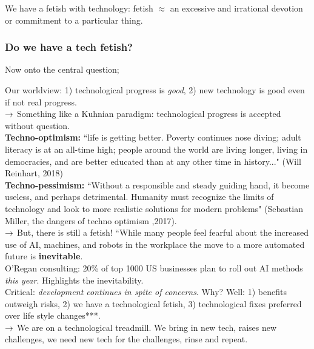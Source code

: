 We have a fetish with technology: fetish $\approx$ an excessive and irrational devotion or commitment to a particular thing.

\subsubsection{Do we have a tech fetish?}

Now onto the central question;


Our worldview: 1) technological progress is {\it good}, 2) new technology is good even if not real progress. \\

$\rightarrow$ Something like a Kuhnian paradigm: technological progress is accepted without question. \\

{\bf Techno-optimism:} ``life is getting better. Poverty continues nose diving; adult literacy is at an all-time high; people around the world are living longer, living in democracies, and are better educated than at any other time in history..." (Will Reinhart, 2018) \\

{\bf Techno-pessimism:} ``Without a responsible and steady guiding hand, it become useless, and perhaps detrimental. Humanity must recognize the limits of technology and look to more realistic solutions for modern problems" (Sebastian Miller, the dangers of techno optimism ,2017). \\

$\rightarrow$ But, there is still a fetish! ``While many people feel fearful about the increased use of AI, machines, and robots in the workplace the move to a more automated future is {\bf inevitable}. \\

O'Regan consulting: 20\% of top 1000 US businesses plan to roll out AI methods {\it this year}. Highlights the inevitability. \\

Critical: {\it development continues in spite of concerns}. Why? Well: 1) benefits outweigh risks, 2) we have a technological fetish, 3) technological fixes preferred over life style changes***. \\

$\rightarrow$ We are on a technological treadmill. We bring in new tech, raises new challenges, we need new tech for the challenges, rinse and repeat. \\





